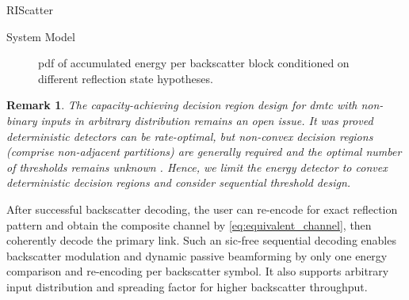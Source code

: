 \documentclass[journal]{IEEEtran}
\newtheorem{remark}{Remark}
\begin{document}
\begin{section}{RIScatter}
\begin{subsection}{System Model}
		\begin{figure}[!t]
			\centering
			\resizebox{0.8\columnwidth}{!}{
				
			}
			\caption{
				\gls{pdf} of accumulated energy per backscatter block conditioned on different reflection state hypotheses.
			}
			\label{fg:energy_distribution}
		\end{figure}
		\begin{remark}
			The capacity-achieving decision region design for \gls{dmtc} with non-binary inputs in arbitrary distribution remains an open issue.
			It was proved deterministic detectors can be rate-optimal, but non-convex decision regions (comprise non-adjacent partitions) are generally required and the optimal number of thresholds remains unknown \cite{Nguyen2018,Nguyen2021}.
			Hence, we limit the energy detector to convex deterministic decision regions and consider sequential threshold design.
		\end{remark}
		After successful backscatter decoding, the user can re-encode for exact reflection pattern and obtain the composite channel by \eqref{eq:equivalent_channel}, then coherently decode the primary link.
		Such an \gls{sic}-free sequential decoding enables backscatter modulation and dynamic passive beamforming by only one energy comparison and re-encoding per backscatter symbol.
		It also supports arbitrary input distribution and spreading factor for higher backscatter throughput.
		\label{st:system_model}
	\end{subsection}


\end{section}
\end{document}
